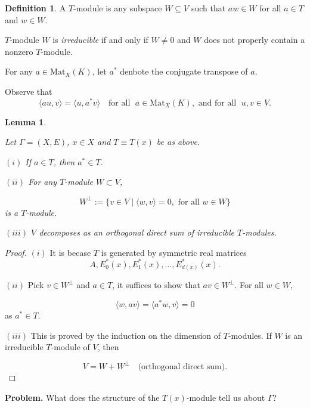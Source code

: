 \documentclass[
]{book}
\newtheorem{lemma}{Lemma}[chapter]
\theoremstyle{definition}
\newtheorem{definition}{Definition}[chapter]
\theoremstyle{definition}
\theoremstyle{definition}
\theoremstyle{definition}
\theoremstyle{remark}
\begin{document}
\begin{definition}
\protect\hypertarget{def:module}{}\label{def:module}A \(T\)-module  is any subspace \(W\subseteq V\) such that \(aw\in W\) for all \(a\in T\) and \(w\in W\).

\(T\)-module \(W\) is \emph{irreducible}  if and only if \(W\neq 0\) and \(W\) does not properly contain a nonzero \(T\)-module.
\end{definition}

For any \(a\in \mathrm{Mat}_X(K)\), let \(a^*\) denbote the conjugate transpose of \(a\).

Observe that
\[\langle au, v\rangle = \langle u, a^*v\rangle \quad \textrm{for all }\; a\in \mathrm{Mat}_X(K), \textrm{ and for all } \; u,v\in V.\]

\begin{lemma}
\protect\hypertarget{lem:complete-reducibility}{}\label{lem:complete-reducibility}

Let \(\Gamma = (X,E)\), \(x\in X\) and \(T \equiv T(x)\) be as above.

\((i)\) If \(a\in T\), then \(a^*\in T\).

\((ii)\) For any \(T\)-module \(W\subset V\),

\[W^\bot := \{v\in V\mid \langle w, v\rangle = 0, \textrm{ for all }w\in W\}\]
is a \(T\)-module.

\((iii)\) \(V\) decomposes as an orthogonal direct sum of irreducible \(T\)-modules.

\end{lemma}

\hfill\break

\begin{proof}
\((i)\) It is becase \(T\) is generated by symmetric real matrices
\[A, E^*_0(x), E^*_1(x), \ldots, E^*_{d(x)}(x).\]

\((ii)\) Pick \(v\in W^\bot\) and \(a\in T\), it suffices to show that \(av\in W^\bot\). For all \(w\in W\),

\[\langle w, av\rangle = \langle a^*w, v\rangle = 0\]
as \(a^*\in T\).

\((iii)\) This is proved by the induction on the dimension of \(T\)-modules. If \(W\) is an irreducible \(T\)-module of \(V\), then

\[V = W + W^\bot \quad \textrm{(orthogonal direct sum)}.\]
\end{proof}

\textbf{Problem. }
What does the structure of the \(T(x)\)-module tell us about \(\Gamma\)?
\end{document}
